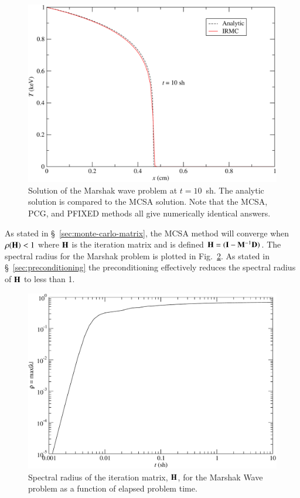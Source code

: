 \documentclass[preprint,12pt]{elsarticle}
\newcommand{\vI}{\ensuremath{\ve{I}}}
\begin{document}
\begin{figure}[h!]
  \centerline{ \includegraphics[width=5in,clip]{marshak_10.pdf}}
  \caption{ Solution of the Marshak wave problem at $t=10$~sh.  The
    analytic solution is compared to the MCSA solution.  Note that the
    MCSA, PCG, and PFIXED methods all give numerically identical
    answers.}
  \label{fig:marshak_10}
\end{figure}

As stated in \S~\ref{sec:monte-carlo-matrix}, the MCSA method will
converge when $\rho(\mathbf{H})< 1$ where $\mathbf{H}$ is the iteration matrix
and is defined $\ve{H} = (\vI - \ve{M}^{-1}\ve{D})$.  The spectral
radius for the Marshak problem is plotted in
Fig.~\ref{fig:marshak_spectral}.  As stated in
\S~\ref{sec:preconditioning} the preconditioning effectively reduces
the spectral radius of $\mathbf{H}$ to less than 1.

\begin{figure}[h!]
  \centerline{ \includegraphics[width=5in,clip]{spectral_radius.pdf}}
  \caption{Spectral radius of the iteration matrix, $\mathbf{H}$, for the
    Marshak Wave problem as a function of elapsed problem time.}
  \label{fig:marshak_spectral}
\end{figure}
\end{document}
